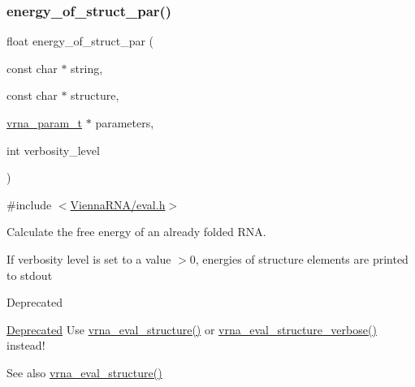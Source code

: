 \subsubsection{\texorpdfstring{energy\+\_\+of\+\_\+struct\+\_\+par()}{energy\_of\_struct\_par()}}
{\footnotesize\ttfamily float energy\+\_\+of\+\_\+struct\+\_\+par (\begin{DoxyParamCaption}\item[{const char $\ast$}]{string,  }\item[{const char $\ast$}]{structure,  }\item[{\hyperlink{group__energy__parameters_ga8a69ca7d787e4fd6079914f5343a1f35}{vrna\+\_\+param\+\_\+t} $\ast$}]{parameters,  }\item[{int}]{verbosity\+\_\+level }\end{DoxyParamCaption})}



{\ttfamily \#include $<$\hyperlink{eval_8h}{Vienna\+R\+N\+A/eval.\+h}$>$}



Calculate the free energy of an already folded R\+NA. 

If verbosity level is set to a value $>$0, energies of structure elements are printed to stdout

\begin{DoxyRefDesc}{Deprecated}
\item[\hyperlink{deprecated__deprecated000050}{Deprecated}]Use \hyperlink{group__eval_ga58f199f1438d794a265f3b27fc8ea631}{vrna\+\_\+eval\+\_\+structure()} or \hyperlink{group__eval_ga0928d699d310178f84ee2351034e5cb5}{vrna\+\_\+eval\+\_\+structure\+\_\+verbose()} instead!\end{DoxyRefDesc}


\begin{DoxySeeAlso}{See also}
\hyperlink{group__eval_ga58f199f1438d794a265f3b27fc8ea631}{vrna\+\_\+eval\+\_\+structure()}
\end{DoxySeeAlso}

